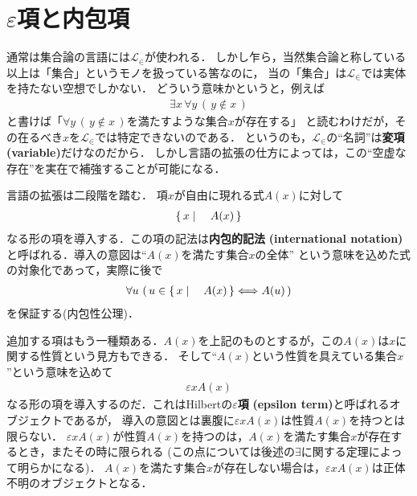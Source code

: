 \chapter{$\varepsilon$項と内包項}
	通常は集合論の言語には$\mathcal{L}_{\in}$が使われる．
	しかし乍ら，当然集合論と称している以上は「集合」というモノを扱っている筈なのに，
	当の「集合」は$\mathcal{L}_{\in}$では実体を持たない空想でしかない．
	どういう意味かというと，例えば
	\begin{align}	
		\exists x\, \forall y\, (\, y \notin x\, )
	\end{align}
	と書けば「$\forall y\, (\, y \notin x\, )$を満たすような集合$x$が存在する」
	と読むわけだが，その在るべき$x$を$\mathcal{L}_{\in}$では特定できないのである．
	というのも，$\mathcal{L}_{\in}$の``名詞''は{\bf 変項}{\bf (variable)}だけなのだから．
	しかし言語の拡張の仕方によっては，この``空虚な存在''を実在で補強することが可能になる．
	
	\begin{comment}
	...
	考えてみれば愈々不可解である．そもそも集合なるものは我々の想像の中にしかないものであって，
	その想像を紙の上に具象化したはずの``集合論''の世界においてさえ集合が虚構に追いやられているなんて，
	どうして易々と看過できようか．
	この点で，$\mathcal{L}_{\in}$のみで集合論を展開することには感覚的に大きな抵抗があるわけだ．
	そこで，集合を具体的なオブジェクトとして扱えるように言語を拡張しようではないか
	(と意気込んではみるものの，遍く受け入れられている{\bf ZFC}集合論に上手く馴染めない
	偏屈な異分子のたわ言，と一笑に付されるかもしれない．まあこう弱気になることも多々あるが，
	修士号のためには偏執的なこだわりだって岩をも通すのである！)．
	
	\end{comment}
	
	言語の拡張は二段階を踏む．
	項$x$が自由に現れる式$A(x)$に対して
	\begin{align}
		\left\{\, x \mid \quad A(x)\, \right\}
	\end{align}
	なる形の項を導入する．この項の記法は{\bf 内包的記法}
	{\bf (international notation)}と呼ばれる．導入の意図は``$A(x)$を満たす集合$x$の全体''
	という意味を込めた式の対象化であって，実際に後で
	\begin{align}
		\forall u\, \left(\, u \in \left\{\, x \mid \quad A(x)\, \right\} \Longleftrightarrow A(u)\, \right)
	\end{align}
	を保証する(内包性公理)．
	
	追加する項はもう一種類ある．$A(x)$を上記のものとするが，この$A(x)$は$x$に関する性質という見方もできる．
	そして``$A(x)$という性質を具えている集合$x$''という意味を込めて
	\begin{align}
		\varepsilon x A(x)
	\end{align}
	なる形の項を導入するのだ．これはHilbertの{\bf $\varepsilon$項}
	{\bf (epsilon term)}と呼ばれるオブジェクトであるが，
	導入の意図とは裏腹に$\varepsilon x A(x)$は性質$A(x)$を持つとは限らない．
	$\varepsilon x A(x)$が性質$A(x)$を持つのは，$A(x)$を満たす集合$x$が存在するとき，またその時に限られる
	(この点については後述の$\exists$に関する定理によって明らかになる)．
	$A(x)$を満たす集合$x$が存在しない場合は，$\varepsilon x A(x)$は正体不明のオブジェクトとなる．
	

